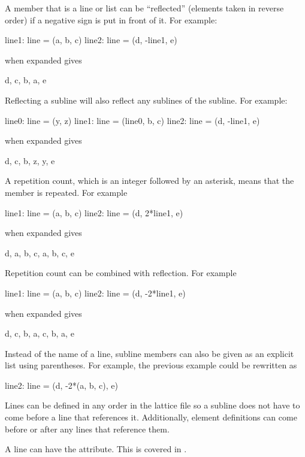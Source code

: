 A member that is a line or list can be ``reflected''
(elements taken in reverse order) if
a negative sign is put in front of it. For example:
\begin{example}
  line1: line = (a, b, c)
  line2: line = (d, -line1, e)
\end{example}
 when expanded gives
\begin{example}
  d, c, b, a, e
\end{example}
Reflecting a subline will also reflect any sublines of the subline. For
example:
\begin{example}
  line0: line = (y, z)
  line1: line = (line0, b, c)
  line2: line = (d, -line1, e)
\end{example}
 when expanded gives
\begin{example}
  d, c, b, z, y, e
\end{example}

A repetition count, which is an integer followed by an asterisk, 
means that the member is
repeated. For example
\begin{example}
  line1: line = (a, b, c)
  line2: line = (d, 2*line1, e)
\end{example}
 when expanded gives
\begin{example}
  d, a, b, c, a, b, c, e
\end{example}
Repetition count can be combined with reflection. For example
\begin{example}
  line1: line = (a, b, c)
  line2: line = (d, -2*line1, e)
\end{example}
 when expanded gives
\begin{example}
  d, c, b, a, c, b, a, e
\end{example}
Instead of the name of a line, subline members can also be given as an explicit 
list using parentheses. For example, the previous example could be rewritten as
\begin{example}
  line2: line = (d, -2*(a, b, c), e)
\end{example}

Lines can be defined in any order in the lattice file so a subline
does not have to come before a line that references it. Additionally,
element definitions can come before or after any lines that reference
them.

A line can have the  attribute. This is covered in
.

